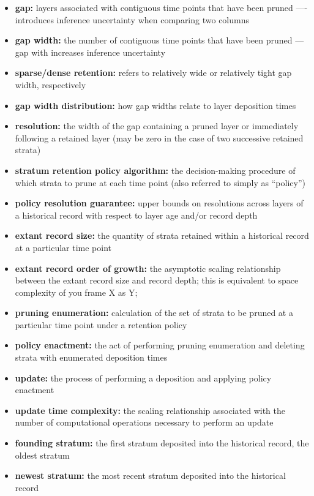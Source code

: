 \begin{itemize}
  \item \textbf{gap:} layers associated with contiguous time points that have been pruned ---- introduces inference uncertainty when comparing two columns
  \item \textbf{gap width:} the number of contiguous time points that have been pruned --- gap with increases inference uncertainty
  \item \textbf{sparse/dense retention:} refers to relatively wide or relatively tight gap width, respectively
  \item \textbf{gap width distribution:} how gap widths relate to layer deposition times
  \item \textbf{resolution:} the width of the gap containing a pruned layer or immediately following a retained layer (may be zero in the case of two successive retained strata)
  \item \textbf{stratum retention policy algorithm:} the decision-making procedure of which strata to prune at each time point (also referred to simply as ``policy'')
  \item \textbf{policy resolution guarantee:} upper bounds on resolutions across layers of a historical record with respect to layer age and/or record depth
  \item \textbf{extant record size:} the quantity of strata retained within a historical record at a particular time point
  \item \textbf{extant record order of growth:} the asymptotic scaling relationship between the extant record size and record depth; this is equivalent to space complexity of you frame X as Y;
  \item \textbf{pruning enumeration:} calculation of the set of strata to be pruned at a particular time point under a retention policy
  \item \textbf{policy enactment:} the act of performing pruning enumeration and deleting strata with enumerated deposition times
  \item \textbf{update:} the process of performing a deposition and applying policy enactment
  \item \textbf{update time complexity:} the scaling relationship associated with the number of computational operations necessary to perform an update
  \item \textbf{founding stratum:} the first stratum deposited into the historical record, the oldest stratum
  \item \textbf{newest stratum:} the most recent stratum deposited into the historical record

\end{itemize}
